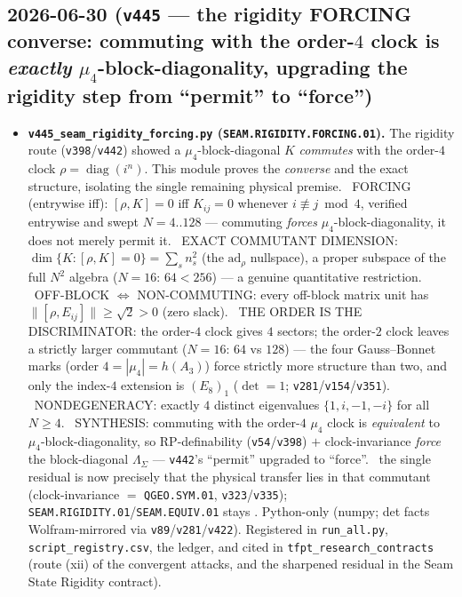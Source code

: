 \subsection*{2026-06-30 (\texttt{v445} --- the rigidity FORCING converse: commuting with the order-$4$ clock is \emph{exactly} $\mu_4$-block-diagonality, upgrading the rigidity step from ``permit'' to ``force'')}
\begin{itemize}
\item \textbf{\texttt{v445\_seam\_rigidity\_forcing.py} (\texttt{SEAM.RIGIDITY.FORCING.01}).} The rigidity route
(\texttt{v398}/\texttt{v442}) showed a $\mu_4$-block-diagonal $K$ \emph{commutes} with the order-$4$ clock
$\rho{=}\operatorname{diag}(i^n)$. This module proves the \emph{converse} and the exact structure, isolating the
single remaining physical premise. \mE\ FORCING (entrywise iff): $[\rho,K]{=}0$ iff $K_{ij}{=}0$ whenever
$i{\not\equiv}j\bmod4$, verified entrywise and swept $N{=}4..128$ --- commuting \emph{forces}
$\mu_4$-block-diagonality, it does not merely permit it. \mE\ EXACT COMMUTANT DIMENSION:
$\dim\{K:[\rho,K]{=}0\}{=}\sum_s n_s^2$ (the $\mathrm{ad}_\rho$ nullspace), a proper subspace of the full $N^2$
algebra ($N{=}16$: $64{<}256$) --- a genuine quantitative restriction. \mE\ OFF-BLOCK $\Leftrightarrow$
NON-COMMUTING: every off-block matrix unit has $\|[\rho,E_{ij}]\|{\ge}\sqrt2{>}0$ (zero slack). \mE\ THE ORDER IS
THE DISCRIMINATOR: the order-$4$ clock gives $4$ sectors; the order-$2$ clock leaves a strictly larger commutant
($N{=}16$: $64$ vs $128$) --- the four Gauss--Bonnet marks (order $4{=}|\mu_4|{=}h(A_3)$) force strictly more
structure than two, and only the index-$4$ extension is $(E_8)_1$ ($\det{=}1$; \texttt{v281}/\texttt{v154}/\texttt{v351}).
\mE\ NONDEGENERACY: exactly $4$ distinct eigenvalues $\{1,i,-1,-i\}$ for all $N{\ge}4$. \mC\ SYNTHESIS: commuting
with the order-$4$ $\mu_4$ clock is \emph{equivalent} to $\mu_4$-block-diagonality, so RP-definability
(\texttt{v54}/\texttt{v398}) $+$ clock-invariance \emph{force} the block-diagonal $\Lambda_\Sigma$ ---
\texttt{v442}'s ``permit'' upgraded to ``force''. \mO\ the single residual is now precisely that the physical
transfer lies in that commutant (clock-invariance $=$ \texttt{QGEO.SYM.01}, \texttt{v323}/\texttt{v335});
\texttt{SEAM.RIGIDITY.01}/\texttt{SEAM.EQUIV.01} stays \mO. Python-only (numpy; det facts Wolfram-mirrored via
\texttt{v89}/\texttt{v281}/\texttt{v422}). Registered in \texttt{run\_all.py}, \texttt{script\_registry.csv}, the
ledger, and cited in \texttt{tfpt\_research\_contracts} (route (xii) of the convergent attacks, and the sharpened
residual in the Seam State Rigidity contract).
\end{itemize}


